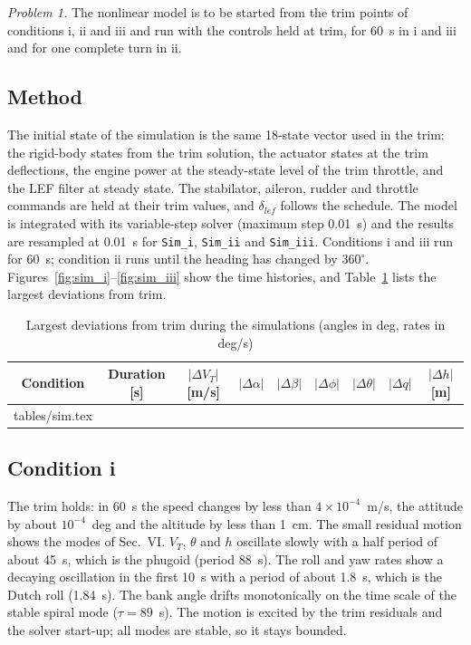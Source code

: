 \documentclass[conf]{new-aiaa}
\makeatletter
\newcommand\tabinput[1]{\@@input #1 }
\makeatother
\begin{document}
\emph{Problem 1.} The nonlinear model is to be started from the trim points of conditions i, ii and iii and run with the controls held at trim, for 60~s in i and iii and for one complete turn in ii.

\subsection{Method}
The initial state of the simulation is the same 18-state vector used in the trim: the rigid-body states from the trim solution, the actuator states at the trim deflections, the engine power at the steady-state level of the trim throttle, and the LEF filter at steady state. The stabilator, aileron, rudder and throttle commands are held at their trim values, and $\delta_{lef}$ follows the schedule. The model is integrated with its variable-step solver (maximum step 0.01~s) and the results are resampled at 0.01~s for \texttt{Sim\_i}, \texttt{Sim\_ii} and \texttt{Sim\_iii}. Conditions i and iii run for 60~s; condition ii runs until the heading has changed by $360^\circ$. Figures~\ref{fig:sim_i}--\ref{fig:sim_iii} show the time histories, and Table~\ref{tab:sim} lists the largest deviations from trim.

\begin{table}[hbt!]
\caption{\label{tab:sim} Largest deviations from trim during the simulations (angles in deg, rates in deg/s)}
\centering
\begin{tabular}{ccccccccc}
\toprule
Condition & Duration [s] & $|\Delta V_T|$ [m/s] & $|\Delta\alpha|$ & $|\Delta\beta|$ & $|\Delta\phi|$ & $|\Delta\theta|$ & $|\Delta q|$ & $|\Delta h|$ [m] \\
\midrule
\tabinput{tables/sim.tex}
\bottomrule
\end{tabular}
\end{table}

\subsection{Condition i}
The trim holds: in 60~s the speed changes by less than $4\times10^{-4}$~m/s, the attitude by about $10^{-4}$~deg and the altitude by less than 1~cm. The small residual motion shows the modes of Sec.~VI. $V_T$, $\theta$ and $h$ oscillate slowly with a half period of about 45~s, which is the phugoid (period 88~s). The roll and yaw rates show a decaying oscillation in the first 10~s with a period of about 1.8~s, which is the Dutch roll (1.84~s). The bank angle drifts monotonically on the time scale of the stable spiral mode ($\tau=89$~s). The motion is excited by the trim residuals and the solver start-up; all modes are stable, so it stays bounded.
\end{document}
